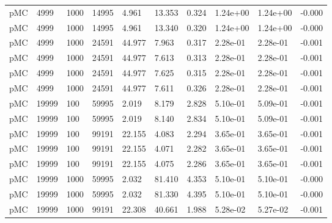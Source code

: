 \begin{tabular}{llllllllll}
 pMC &   4999 &       1000 &       14995 &     4.961 &                       13.353 &          0.324 &         1.24e+00 &        1.24e+00 &       -0.000 \\
 pMC &   4999 &       1000 &       14995 &     4.961 &                       13.340 &          0.320 &         1.24e+00 &        1.24e+00 &       -0.000 \\
 pMC &   4999 &       1000 &       24591 &    44.977 &                        7.963 &          0.317 &         2.28e-01 &        2.28e-01 &       -0.001 \\
 pMC &   4999 &       1000 &       24591 &    44.977 &                        7.613 &          0.313 &         2.28e-01 &        2.28e-01 &       -0.001 \\
 pMC &   4999 &       1000 &       24591 &    44.977 &                        7.625 &          0.315 &         2.28e-01 &        2.28e-01 &       -0.001 \\
 pMC &   4999 &       1000 &       24591 &    44.977 &                        7.611 &          0.326 &         2.28e-01 &        2.28e-01 &       -0.001 \\
 pMC &  19999 &        100 &       59995 &     2.019 &                        8.179 &          2.828 &         5.10e-01 &        5.09e-01 &       -0.001 \\
 pMC &  19999 &        100 &       59995 &     2.019 &                        8.140 &          2.834 &         5.10e-01 &        5.09e-01 &       -0.001 \\
 pMC &  19999 &        100 &       99191 &    22.155 &                        4.083 &          2.294 &         3.65e-01 &        3.65e-01 &       -0.001 \\
 pMC &  19999 &        100 &       99191 &    22.155 &                        4.071 &          2.282 &         3.65e-01 &        3.65e-01 &       -0.001 \\
 pMC &  19999 &        100 &       99191 &    22.155 &                        4.075 &          2.286 &         3.65e-01 &        3.65e-01 &       -0.001 \\
 pMC &  19999 &       1000 &       59995 &     2.032 &                       81.410 &          4.353 &         5.10e-01 &        5.10e-01 &       -0.000 \\
 pMC &  19999 &       1000 &       59995 &     2.032 &                       81.330 &          4.395 &         5.10e-01 &        5.10e-01 &       -0.000 \\
 pMC &  19999 &       1000 &       99191 &    22.308 &                       40.661 &          1.988 &         5.28e-02 &        5.27e-02 &       -0.001 \\

\end{tabular}

